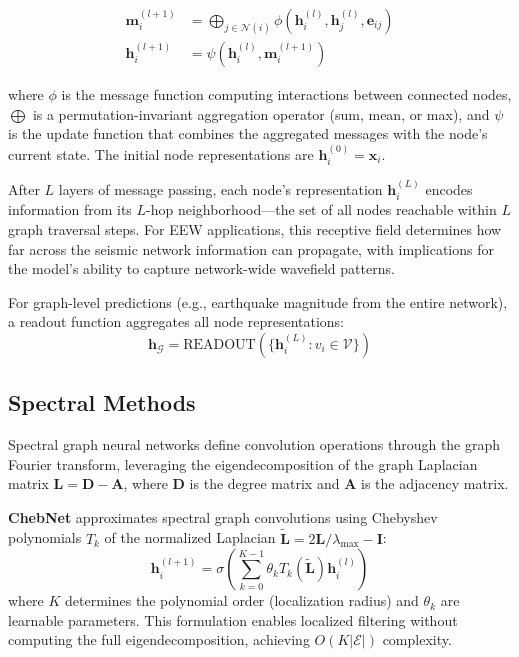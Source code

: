 \documentclass[review,authoryear]{elsarticle}
\begin{document}
\begin{align}
\mathbf{m}_i^{(l+1)} &= \bigoplus_{j \in \mathcal{N}(i)} \phi\left(\mathbf{h}_i^{(l)}, \mathbf{h}_j^{(l)}, \mathbf{e}_{ij}\right) \label{eq:message} \\
\mathbf{h}_i^{(l+1)} &= \psi\left(\mathbf{h}_i^{(l)}, \mathbf{m}_i^{(l+1)}\right) \label{eq:update}
\end{align}

where $\phi$ is the message function computing interactions between connected nodes, $\bigoplus$ is a permutation-invariant aggregation operator (sum, mean, or max), and $\psi$ is the update function that combines the aggregated messages with the node's current state. The initial node representations are $\mathbf{h}_i^{(0)} = \mathbf{x}_i$.

After $L$ layers of message passing, each node's representation $\mathbf{h}_i^{(L)}$ encodes information from its $L$-hop neighborhood---the set of all nodes reachable within $L$ graph traversal steps. For EEW applications, this receptive field determines how far across the seismic network information can propagate, with implications for the model's ability to capture network-wide wavefield patterns.

For graph-level predictions (e.g., earthquake magnitude from the entire network), a readout function aggregates all node representations:
\begin{equation}
\mathbf{h}_{\mathcal{G}} = \text{READOUT}\left(\{\mathbf{h}_i^{(L)} : v_i \in \mathcal{V}\}\right)
\end{equation}

\subsection{Spectral Methods}

Spectral graph neural networks define convolution operations through the graph Fourier transform, leveraging the eigendecomposition of the graph Laplacian matrix $\mathbf{L} = \mathbf{D} - \mathbf{A}$, where $\mathbf{D}$ is the degree matrix and $\mathbf{A}$ is the adjacency matrix.

\textbf{ChebNet} \citep{defferrard2016convolutional} approximates spectral graph convolutions using Chebyshev polynomials $T_k$ of the normalized Laplacian $\tilde{\mathbf{L}} = 2\mathbf{L}/\lambda_{\max} - \mathbf{I}$:
\begin{equation}
\mathbf{h}_i^{(l+1)} = \sigma\left(\sum_{k=0}^{K-1} \theta_k T_k(\tilde{\mathbf{L}}) \mathbf{h}_i^{(l)}\right)
\end{equation}
where $K$ determines the polynomial order (localization radius) and $\theta_k$ are learnable parameters. This formulation enables localized filtering without computing the full eigendecomposition, achieving $O(K|\mathcal{E}|)$ complexity.
\end{document}
